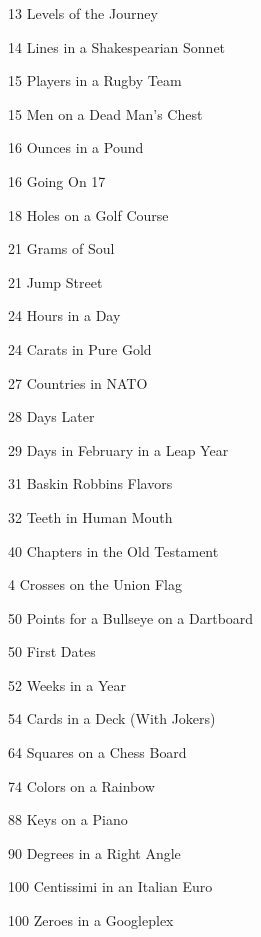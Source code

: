 \documentclass[10pt]{article}
\begin{document}
\begin{multicols}{4}
\begin{description}
     \item 13 \w L{evels}  of the \w J{ourney}
    \item 14 \w L{ines} in a \w S{hakespearian} \w S{onnet}
    \item 15 \w P{layers} in a \w R{ugby} \w T{eam}
    \item 15 \w M{en} on a \w D{ead} \w M{an's} \w C{hest}
    \item 16 \w O{unces} in a \w P{ound}
	\item 16 \w G{oing} \w O{n} 17
    \item 18 \w H{oles} on a \w G{olf} \w C{ourse}
    \item 21 \w G{rams} of \w S{oul}
	\item 21 \w J{ump} \w S{treet}
    \item 24 \w H{ours} in a \w D{ay}
    \item 24 \w C{arats} in \w P{ure} \w G{old}
    \item 27 \w C{ountries} in \w N{ATO}
	\item 28 \w D{ays} \w L{ater}
    \item 29 \w D{ays} in \w F{ebruary} in a \w L{eap} \w Y{ear}
    \item 31 \w B{askin} \w R{obbins} \w F{lavors}
    \item 32 \w T{eeth} in \w H{uman} \w M{outh}
    \item 40 \w C{hapters} in the \w O{ld} \w T{estament}
    \item 4 \w C{rosses} on the \w U{nion} \w F{lag}
    \item 50 \w P{oints} for a \w B{ullseye} on a \w D{artboard}
	\item 50 \w F{irst} \w D{ates}
    \item 52 \w W{eeks} in a \w Y{ear}
    \item 54 \w C{ards} in a \w D{eck} (\w W{ith} \w J{okers})
    \item 64 \w S{quares} on a \w C{hess} \w B{oard}
    \item 74 \w C{olors} on a \w R{ainbow}
    \item 88 \w K{eys} on a \w P{iano}
    \item 90 \w D{egrees} in a \w R{ight} \w A{ngle}
    \item 100 \w C{entissimi} in an \w I{talian} \w E{uro}
     \item 100 \w Z{eroes} in a \w G{oogleplex}

\end{description}
\end{multicols}
\end{document}
